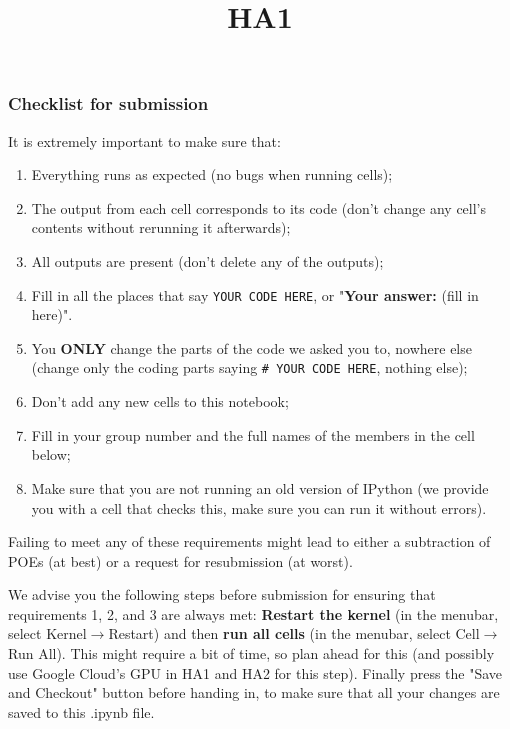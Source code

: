 \documentclass[11pt]{article}
\title{HA1}
\providecommand{\tightlist}{%
      \setlength{\itemsep}{0pt}\setlength{\parskip}{0pt}}
\begin{document}
    
    
    \maketitle
    
    

    
    \subsubsection{Checklist for submission}\label{checklist-for-submission}

It is extremely important to make sure that:

\begin{enumerate}
\def\labelenumi{\arabic{enumi}.}
\tightlist
\item
  Everything runs as expected (no bugs when running cells);
\item
  The output from each cell corresponds to its code (don't change any
  cell's contents without rerunning it afterwards);
\item
  All outputs are present (don't delete any of the outputs);
\item
  Fill in all the places that say \texttt{YOUR\ CODE\ HERE}, or
  "\textbf{Your answer:} (fill in here)".
\item
  You \textbf{ONLY} change the parts of the code we asked you to,
  nowhere else (change only the coding parts saying
  \texttt{\#\ YOUR\ CODE\ HERE}, nothing else);
\item
  Don't add any new cells to this notebook;
\item
  Fill in your group number and the full names of the members in the
  cell below;
\item
  Make sure that you are not running an old version of IPython (we
  provide you with a cell that checks this, make sure you can run it
  without errors).
\end{enumerate}

Failing to meet any of these requirements might lead to either a
subtraction of POEs (at best) or a request for resubmission (at worst).

We advise you the following steps before submission for ensuring that
requirements 1, 2, and 3 are always met: \textbf{Restart the kernel} (in
the menubar, select Kernel\(\rightarrow\)Restart) and then \textbf{run
all cells} (in the menubar, select Cell\(\rightarrow\)Run All). This
might require a bit of time, so plan ahead for this (and possibly use
Google Cloud's GPU in HA1 and HA2 for this step). Finally press the
"Save and Checkout" button before handing in, to make sure that all your
changes are saved to this .ipynb file.
\end{document}
